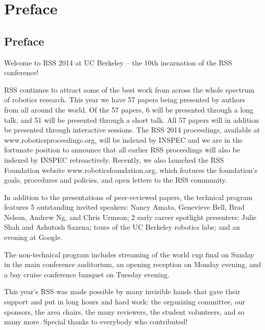 
\chapter*{Preface}


                                                                     
                                             
\vspace{3cm}
\section*{Preface}
\begingroup{}
\Large
\vspace{1cm}

Welcome to RSS 2014 at UC Berkeley – the 10th incarnation of the RSS conference!

RSS continues to attract some of the best work from across the whole spectrum of robotics research. This year we have 57 papers being presented by authors from all around the world. Of the 57 papers, 6 will be presented through a long talk, and 51 will be presented through a short talk. All 57 papers will in addition be presented through interactive sessions. The RSS 2014 proceedings, available at www.roboticsproceedings.org, will be indexed by INSPEC and we are in the fortunate position to announce that all earlier RSS proceedings will also be indexed by INSPEC retroactively. Recently, we also launched the RSS Foundation website www.roboticsfoundation.org, which features the foundation's goals, procedures and policies, and open letters to the RSS community.

In addition to the presentations of peer-reviewed papers, the technical program features 5 outstanding invited speakers: Nancy Amato, Genevieve Bell, Brad Nelson, Andrew Ng, and Chris Urmson; 2 early career spotlight presenters: Julie Shah and Ashutosh Saxena; tours of the UC Berkeley robotics labs; and an evening at Google.

The non-technical program includes streaming of the world cup final on Sunday in the main conference auditorium, an opening reception on Monday evening, and a bay cruise conference banquet on Tuesday evening.

This year’s RSS was made possible by many invisible hands that gave their support and put in long hours and hard work: the organizing committee, our sponsors, the area chairs, the many reviewers, the student volunteers, and so many more. Special thanks to everybody who contributed!

